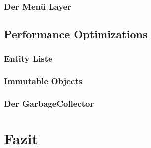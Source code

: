 		\subsubsection{Der Menü Layer}				\label{sec:E8}		\clearpage
	\subsection{Performance Optimizations}			\label{sec:F0}		\clearpage
		\subsubsection{Entity Liste}				\label{sec:F1}		\clearpage
		\subsubsection{Immutable Objects}			\label{sec:F2}		\clearpage
		\subsubsection{Der GarbageCollector}		\label{sec:F3}		\clearpage
\section{Fazit}                                     \label{sec:G0}		\clearpage
